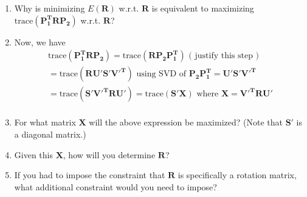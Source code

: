 \documentclass{article}
\begin{document}
\begin{enumerate}
\begin{enumerate}
    \item Why is minimizing $E(\boldsymbol{R})$ w.r.t. $\boldsymbol{R}$ is equivalent to maximizing $\textrm{trace}(\boldsymbol{P^T_1 R P_2})$ w.r.t. $\boldsymbol{R}$?

    \item Now, we have
        \begin{eqnarray}
        \textrm{trace}(\boldsymbol{P^T_1 R P_2}) = \textrm{trace}(\boldsymbol{R P_2 P^T_1})  \textrm{ ( justify this step ) } \\ 
        = \textrm{trace}(\boldsymbol{R U'S'V'^T}) \textrm{ using SVD of } \boldsymbol{P_2 P^T_1 = U'S'V'^T} \\
        = \textrm{trace}(\boldsymbol{S' V'^TR U'}) = \textrm{trace}(\boldsymbol{S' X}) \textrm{ where } \boldsymbol{X} = \boldsymbol{V'^TR U'} \\
        \end{eqnarray}

    \item For what matrix $\boldsymbol{X}$ will the above expression be maximized? (Note that $\boldsymbol{S'}$ is a diagonal matrix.)
    \item Given this $\boldsymbol{X}$, how will you determine $\boldsymbol{R}$? 
    \item If you had to impose the constraint that $\boldsymbol{R}$ is specifically a rotation matrix, what additional constraint would you need to impose? 
\end{enumerate}


\\
\\


\end{enumerate}
\end{document}
